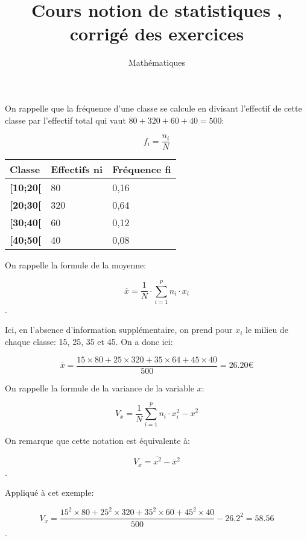 \documentclass[a4paper,12pt]{scrartcl}
\date{}
\title{Cours \og notion de statistiques \fg{}, corrigé des exercices}
\author{Mathématiques}
\begin{document}
\maketitle



On rappelle que la fréquence d'une classe se calcule en divisant l'effectif de cette classe par l'effectif total qui vaut $80 + 320 + 60 + 40 = 500$:

$$f_i = \dfrac{n_i}{N}$$

\begin{center}
\begin{tabular}{@{}|l|l|l|@{}}
\toprule
\textbf{Classe} & \textbf{Effectifs ni} & \textbf{Fréquence fi} \\ \midrule
\textbf{{[}10;20{[}} & 80 & 0,16 \\ \midrule
\textbf{{[}20;30{[}} & 320 & 0,64 \\ \midrule
\textbf{{[}30;40{[}} & 60 & 0,12 \\ \midrule
\textbf{{[}40;50{[}} & 40 & 0,08 \\ \bottomrule
\end{tabular}
\end{center}


On rappelle la formule de la moyenne:

$$\overline{x} = \dfrac{1}{N} \cdot \sum_{i=1}^{p} n_i \cdot x_i $$.

Ici, en l'absence d'information supplémentaire, on prend pour $x_i$ le milieu de chaque classe: 15, 25, 35 et 45. On a donc ici: 

$$\overline{x} = \dfrac{15 \times 80 + 25 \times 320 + 35 \times 64 + 45 \times 40}{500} = 26.20 \mbox{€}$$ 



On rappelle la formule de la variance de la variable $x$:

$$V_x = \dfrac{1}{N} \sum_{i=1}^{p} n_i \cdot x_i^2 - \overline{x}^2$$

On remarque que cette notation est équivalente à:

$$V_x = \overline{x^2} - \overline{x}^2$$.

Appliqué à cet exemple:

$$V_x = \dfrac{15^2 \times 80 + 25^2 \times 320 + 35^2 \times 60 + 45^2 \times 40}{500} - 26.2^2 = 58.56$$.
\end{document}
